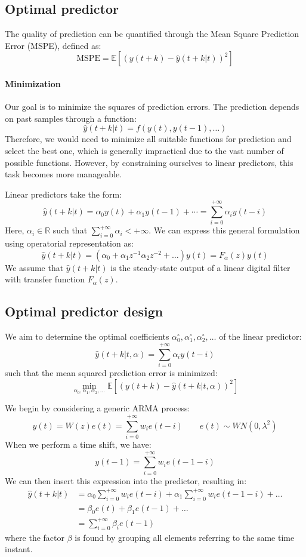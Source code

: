 \subsection{Optimal predictor}

The quality of prediction can be quantified through the Mean Square Prediction Error (MSPE), defined as:
\[\text{MSPE}=\mathbb{E}\left[ {\left(y(t+k)-\hat{y}(t+k|t) \right)}^2 \right]\]

\paragraph*{Minimization}
Our goal is to minimize the squares of prediction errors. 
The prediction depends on past samples through a function:
\[\hat{y}(t+k|t)=f(y(t),y(t-1),\dots)\]
Therefore, we would need to minimize all suitable functions for prediction and select the best one, which is generally impractical due to the vast number of possible functions. 
However, by constraining ourselves to linear predictors, this task becomes more manageable.

Linear predictors take the form:
\[\hat{y}(t+k|t)=\alpha_0y(t)+\alpha_1y(t-1)+\cdots=\sum_{i=0}^{+\infty}\alpha_i y(t-i)\]
Here, $\alpha_i \in \mathbb{R}$ such that $\sum_{i=0}^{+\infty}\alpha_i<+\infty$. 
We can express this general formulation using operatorial representation as:
\[\hat{y}(t+k|t)=\left(\alpha_0+\alpha_1z^{-1}\alpha_2z^{-2}+\dots\right)y(t)=F_{\alpha}(z)y(t)\]
We assume that $\hat{y}(t+k|t)$ is the steady-state output of a linear digital filter with transfer function $F_{\alpha}(z)$.

\subsection{Optimal predictor design}
We aim to determine the optimal coefficients $\alpha_0^{\circ},\alpha_1^{\circ},\alpha_2^{\circ},\dots$ of the linear predictor:
\[\hat{y}(t+k|t,\alpha)=\sum_{i=0}^{+\infty}\alpha_i y(t-i)\]
such that the mean squared prediction error is minimized:
\[\min_{\alpha_0,\alpha_1,\alpha_2,\dots}\mathbb{E}\left[{\left( y(t+k)-\hat{y}(t+k|t,\alpha) \right)}^2\right] \]

We begin by considering a generic ARMA process:
\[y(t)=W(z)e(t) =\sum_{i=0}^{+\infty}w_i e(t-i) \qquad e(t)\sim WN(0,\lambda^2)\]
When we perform a time shift, we have:
\[y(t-1)=\sum_{i=0}^{+\infty}w_i e(t-1-i)\]
We can then insert this expression into the predictor, resulting in:
\begin{align*}
    \hat{y}(t+k|t)  &=\alpha_0\sum_{i=0}^{+\infty}w_i e(t-i)+\alpha_1\sum_{i=0}^{+\infty}w_i e(t-1-i)+\dots \\
                    &=\beta_0e(t)+\beta_1e(t-1)+\dots \\
                    &=\sum_{i=0}^{+\infty}\beta_i e(t-1)
\end{align*}
where the factor $\beta$ is found by grouping all elements referring to the same time instant.

